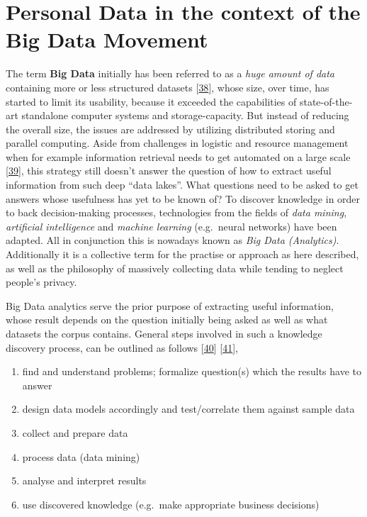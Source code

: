 \documentclass[12pt,english,a4paper,titlepage,cleardoublepage=empty,dottedtoc]{report}
\providecommand{\tightlist}{%
  \setlength{\itemsep}{0pt}\setlength{\parskip}{0pt}}
\begin{document}
\section{Personal Data in the context of the Big Data
Movement}\label{personal-data-in-the-context-of-the-big-data-movement}

The term \textbf{\protect\hypertarget{def--big-data}{}{Big Data}}
initially has been referred to as a \emph{huge amount of data}
containing more or less structured datasets
{[}\protect\hyperlink{ref-web_2016_oxford_definition_big-data}{38}{]},
whose size, over time, has started to limit its usability, because it
exceeded the capabilities of state-of-the-art standalone computer
systems and storage-capacity. But instead of reducing the overall size,
the issues are addressed by utilizing distributed storing and parallel
computing. Aside from challenges in logistic and resource management
when for example information retrieval needs to get automated on a large
scale
{[}\protect\hyperlink{ref-web_2016_wikipedia_definition_big-data}{39}{]},
this strategy still doesn't answer the question of how to extract useful
information from such deep ``data lakes''. What questions need to be
asked to get answers whose usefulness has yet to be known of? To
discover knowledge in order to back decision-making processes,
technologies from the fields of \emph{data mining}, \emph{artificial
intelligence} and \emph{machine learning} (e.g.~neural networks) have
been adapted. All in conjunction this is nowadays known as \emph{Big
Data (Analytics)}. Additionally it is a collective term for the practise
or approach as here described, as well as the philosophy of massively
collecting data while tending to neglect people's privacy.

Big Data analytics serve the prior purpose of extracting useful
information, whose result depends on the question initially being asked
as well as what datasets the corpus contains. General steps involved in
such a knowledge discovery process, can be outlined as follows
{[}\protect\hyperlink{ref-chapter_2007_the-knowledge-discovery-process}{40}{]}
{[}\protect\hyperlink{ref-paper_2009_a-data-mining-knowledge-discovery-process-model}{41}{]},

\begin{enumerate}
\def\labelenumi{\arabic{enumi}.}
\tightlist
\item
  find and understand problems; formalize question(s) which the results
  have to answer
\item
  design data models accordingly and test/correlate them against sample
  data
\item
  collect and prepare data
\item
  process data (data mining)
\item
  analyse and interpret results
\item
  use discovered knowledge (e.g.~make appropriate business decisions)
\end{enumerate}
\end{document}
